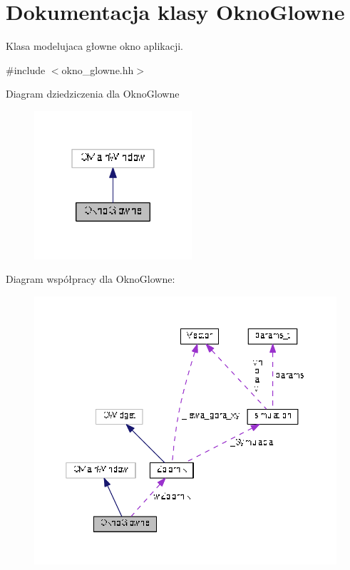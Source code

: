 \hypertarget{class_okno_glowne}{}\section{Dokumentacja klasy Okno\+Glowne}
\label{class_okno_glowne}


Klasa modelujaca głowne okno aplikacji.  




{\ttfamily \#include $<$okno\+\_\+glowne.\+hh$>$}



Diagram dziedziczenia dla Okno\+Glowne\nopagebreak
\begin{figure}[H]
\begin{center}
\leavevmode
\includegraphics[width=166pt]{class_okno_glowne__inherit__graph}
\end{center}
\end{figure}


Diagram współpracy dla Okno\+Glowne\+:
\nopagebreak
\begin{figure}[H]
\begin{center}
\leavevmode
\includegraphics[width=350pt]{class_okno_glowne__coll__graph}
\end{center}
\end{figure}
